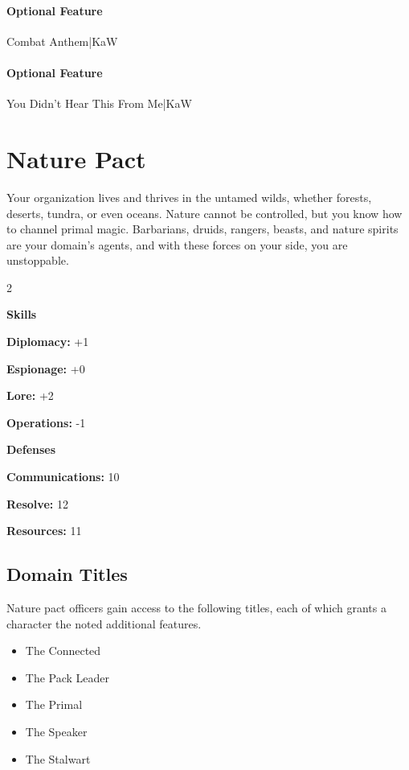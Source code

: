 \documentclass[10pt,a4paper,twoside,bg=print,twocolumn,openany,nodeprecatedcode]{dndbook}
\begin{document}
\paragraph{Optional Feature}
Combat Anthem|KaW

\paragraph{Optional Feature}
You Didn't Hear This From Me|KaW

\section{Nature Pact}
Your organization lives and thrives in the untamed wilds, whether forests, deserts, tundra, or even oceans. Nature cannot be controlled, but you know how to channel primal magic. Barbarians, druids, rangers, beasts, and nature spirits are your domain's agents, and with these forces on your side, you are unstoppable.


\begin{itemize}
\begin{multicols}{2}
\item \textbf{Skills}
\item \textbf{Diplomacy:} +1
\item \textbf{Espionage:} +0
\item \textbf{Lore:} +2
\item \textbf{Operations:} -1
\item \textbf{Defenses}
\item \textbf{Communications:} 10
\item \textbf{Resolve:} 12
\item \textbf{Resources:} 11
\end{multicols}

\end{itemize}

\subsection{Domain Titles}
Nature pact officers gain access to the following titles, each of which grants a character the noted additional features.


\begin{itemize}
\item The Connected
\item The Pack Leader
\item The Primal
\item The Speaker
\item The Stalwart
\end{itemize}
\end{document}
